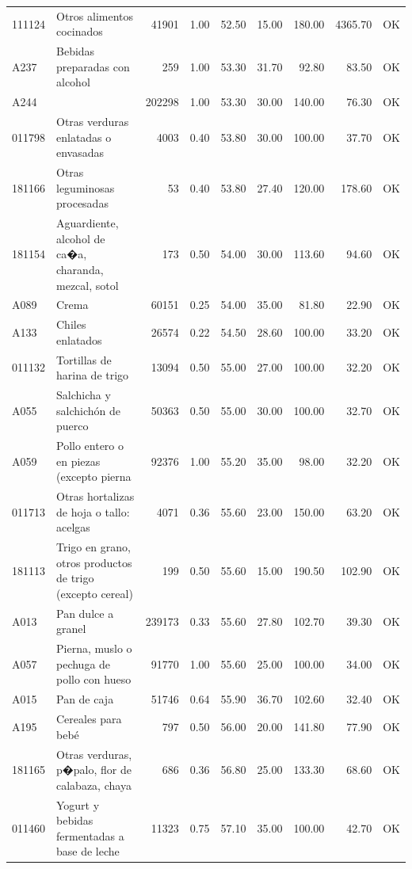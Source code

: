 \begin{table}[ht]
\begin{tabular}{llrrrrrrl}
  111124 & Otros alimentos cocinados & 41901 & 1.00 & 52.50 & 15.00 & 180.00 & 4365.70 & OK \\ 
  A237 & Bebidas preparadas con alcohol & 259 & 1.00 & 53.30 & 31.70 & 92.80 & 83.50 & OK \\ 
  A244 &  & 202298 & 1.00 & 53.30 & 30.00 & 140.00 & 76.30 & OK \\ 
  011798 & Otras verduras enlatadas o envasadas & 4003 & 0.40 & 53.80 & 30.00 & 100.00 & 37.70 & OK \\ 
  181166 & Otras leguminosas procesadas &  53 & 0.40 & 53.80 & 27.40 & 120.00 & 178.60 & OK \\ 
  181154 & Aguardiente, alcohol de ca�a, charanda, mezcal, sotol & 173 & 0.50 & 54.00 & 30.00 & 113.60 & 94.60 & OK \\ 
  A089 & Crema & 60151 & 0.25 & 54.00 & 35.00 & 81.80 & 22.90 & OK \\ 
  A133 & Chiles enlatados & 26574 & 0.22 & 54.50 & 28.60 & 100.00 & 33.20 & OK \\ 
  011132 & Tortillas de harina de trigo & 13094 & 0.50 & 55.00 & 27.00 & 100.00 & 32.20 & OK \\ 
  A055 & Salchicha y salchichón de puerco & 50363 & 0.50 & 55.00 & 30.00 & 100.00 & 32.70 & OK \\ 
  A059 & Pollo entero o en piezas (excepto pierna & 92376 & 1.00 & 55.20 & 35.00 & 98.00 & 32.20 & OK \\ 
  011713 & Otras hortalizas de hoja o tallo: acelgas & 4071 & 0.36 & 55.60 & 23.00 & 150.00 & 63.20 & OK \\ 
  181113 & Trigo en grano, otros productos de trigo (excepto cereal) & 199 & 0.50 & 55.60 & 15.00 & 190.50 & 102.90 & OK \\ 
  A013 & Pan dulce a granel & 239173 & 0.33 & 55.60 & 27.80 & 102.70 & 39.30 & OK \\ 
  A057 & Pierna, muslo o pechuga de pollo con hueso & 91770 & 1.00 & 55.60 & 25.00 & 100.00 & 34.00 & OK \\ 
  A015 & Pan de caja & 51746 & 0.64 & 55.90 & 36.70 & 102.60 & 32.40 & OK \\ 
  A195 & Cereales para bebé & 797 & 0.50 & 56.00 & 20.00 & 141.80 & 77.90 & OK \\ 
  181165 & Otras verduras, p�palo, flor de calabaza, chaya & 686 & 0.36 & 56.80 & 25.00 & 133.30 & 68.60 & OK \\ 
  011460 & Yogurt y bebidas fermentadas a base de leche & 11323 & 0.75 & 57.10 & 35.00 & 100.00 & 42.70 & OK \\ 

\end{tabular}
\end{table}
